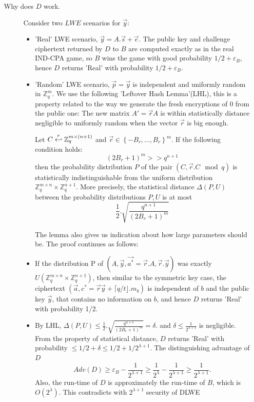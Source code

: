 \begin{description}
\begin{description}
  \item [Why does $D$ work.] Consider two $LWE$ scenarios for $\vec{y}$:
    \begin{itemize}
    \item 'Real' LWE scenario, $\vec{y} = A.\vec{s} + \vec{e}$. The public key
      and challenge ciphertext returned by $D$ to $B$ are computed exactly as in
      the real IND-CPA game, so $B$ wins the game with good probability
      $1/2 + \varepsilon_B$, hence $D$ returns 'Real' with probability
      $1/2 + \varepsilon_B$.
    \item 'Random' LWE scenario, $\vec{p} = \vec{y}$ is independent and
      uniformly random in $\mathbb{Z}_q^m$. We use the following 'Leftover Hash
      Lemma'(LHL), this is a property related to the way we generate the fresh
      encryptions of 0 from the public one: The new matrix $A' = \vec{r}A$ is
      within statistically distance negligible to uniformly random when the
      vector $\vec{r}$ is big enough.
      \begin{lemma}
          Let
        $C \stackrel{r}{\hookleftarrow} \mathbb{Z}_q^{m \times (n+1)}$ and
        $\vec{r} \in \left\{ -B_r, \dots, B_r \right\}^m$. If the following
        condition holds:
        \[
          (2B_r + 1)^m >> q^{n+1}
        \]
        then the probability distribution $P$ of the pair
        $(C, \vec{r}.C \mod q)$ is statistically indistinguishable from the
        uniform distribution
        $\mathbb{Z}_q^{m \times n} \times \mathbb{Z}_q^{n+1}$. More precisely,
        the statistical distance $\Delta(P,U)$ between the probability
        distributions $P,U$ is at most
        \[
          \frac{1}{2} . \sqrt{\frac{q^{n+1}}{(2B_r + 1)^m}}
        \]
        \label{lem:LHL}
      \end{lemma}
      The lemma also gives us indication about how large parameters should
      be. The proof continues as follows:
    \item If the distribution P of
      $(A, \vec{y}, \vec{a^*} = \vec{r} . A, \vec{r}. \vec{y})$ was exactly
      $U(\mathbb{Z}_q^{m \times n} \times \mathbb{Z}_q^{n+1})$, then similar to
      the symmetric key case, the ciphertext
      $(\vec{a}, c^* = \vec{r}\vec{y} + \lceil q/t \rfloor.m_b)$ is independent
      of $b$ and the public key $\vec{y}$, that contains no information on $b$,
      and hence $D$ returns 'Real' with probability 1/2.
    \item By LHL,
      $\Delta(P,U) \leq \frac{1}{2}.
      \sqrt{\frac{q^{n+1}}{(2B_r+1)^m}}=\delta$. and
      $\delta \leq \frac{1}{2^{\lambda+1}}$ is negligible. From the property of
      statistical distance, $D$ returns 'Real' with probability
      $\leq 1/2 + \delta \leq 1/2 + 1/2^{\lambda+1}$. The distinguishing
      advantage of $D$
      \[
        Adv(D) \geq \varepsilon_B - \frac{1}{2^{\lambda+1}} \geq
        \frac{1}{2^\lambda} - \frac{1}{2^{\lambda+1}} \geq
        \frac{1}{2^{\lambda+1}}.
      \]
      Also, the run-time of $D$ is approximately the run-time of $B$, which is
      $O\left( 2^\lambda \right)$. This contradicts with $2^{\lambda + 1}$
      security of DLWE


\end{itemize}
\end{description}
\end{description}
